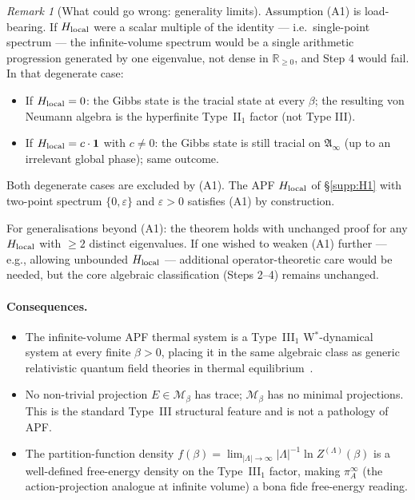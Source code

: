 \documentclass[11pt]{article}
\theoremstyle{plain}
\theoremstyle{definition}
\theoremstyle{remark}
\newtheorem{remark}[theorem]{Remark}
\begin{document}
\begin{remark}[What could go wrong: generality limits]\label{rem:III1_limits}
Assumption (A1) is load-bearing.  If $H_{\rm local}$ were a scalar multiple of the identity --- i.e.\ single-point spectrum --- the infinite-volume spectrum would be a single arithmetic progression generated by one eigenvalue, not dense in $\mathbb{R}_{\geq 0}$, and Step 4 would fail.  In that degenerate case:
\begin{itemize}[leftmargin=2em,itemsep=2pt]
  \item If $H_{\rm local} = 0$: the Gibbs state is the tracial state at every $\beta$; the resulting von Neumann algebra is the hyperfinite Type~II$_1$ factor (not Type III).
  \item If $H_{\rm local} = c \cdot \mathbf{1}$ with $c \neq 0$: the Gibbs state is still tracial on $\mathfrak{A}_\infty$ (up to an irrelevant global phase); same outcome.
\end{itemize}
Both degenerate cases are excluded by (A1).  The APF $H_{\rm local}$ of \S\ref{supp:H1} with two-point spectrum $\{0, \varepsilon\}$ and $\varepsilon > 0$ satisfies (A1) by construction.

For generalisations beyond (A1): the theorem holds with unchanged proof for any $H_{\rm local}$ with $\geq 2$ distinct eigenvalues.  If one wished to weaken (A1) further --- e.g., allowing unbounded $H_{\rm local}$ --- additional operator-theoretic care would be needed, but the core algebraic classification (Steps 2--4) remains unchanged.
\end{remark}

\paragraph{Consequences.}
\begin{itemize}[leftmargin=2em,itemsep=3pt]
  \item The infinite-volume APF thermal system is a Type~III$_1$ W$^*$-dynamical system at every finite $\beta > 0$, placing it in the same algebraic class as generic relativistic quantum field theories in thermal equilibrium~\cite{BuchholzDAntoniLongo}.
  \item No non-trivial projection $E \in \mathcal{M}_\beta$ has trace; $\mathcal{M}_\beta$ has no minimal projections.  This is the standard Type~III structural feature and is not a pathology of APF.
  \item The partition-function density $f(\beta) = \lim_{|\Lambda|\to\infty} |\Lambda|^{-1} \ln Z^{(\Lambda)}(\beta)$ is a well-defined free-energy density on the Type~III$_1$ factor, making $\pi_A^\infty$ (the action-projection analogue at infinite volume) a bona fide free-energy reading.
\end{itemize}
\end{document}
